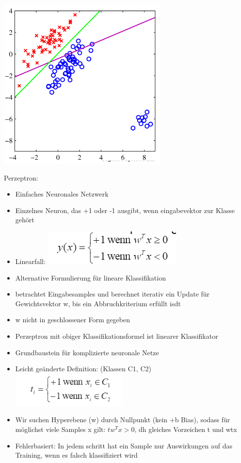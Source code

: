 \documentclass[a4paper,10pt,oneside]{article}
\begin{document}
\begin{itemize}
\includegraphics[scale=0.65]{Grafiken/falschetrennlinie.png}
	
\end{itemize}

Perzeptron:
\begin{itemize}
	\item Einfaches Neuronales Netzwerk
	\item Einzelnes Neuron, das +1 oder -1 ausgibt, wenn eingabevektor zur Klasse gehört
	\item Linearfall:
	\includegraphics[scale=0.65]{Grafiken/perzeptron1.png}
	\item Alternative Formulierung für lineare Klassifikation
	\item betrachtet Eingabesamples und berechnet iterativ ein Update für Gewichtsvektor w, bis ein Abbruchkriterium erfüllt isdt
	\item w nicht in geschlossener Form gegeben
	\item Perzeptron mit obiger Klassifikationsformel ist linearer Klassifikator
	\item Grundbaustein für komplizierte neuronale Netze
	\item Leicht geänderte Definition: (Klassen C1, C2)
		\includegraphics[scale=0.65]{Grafiken/perzeptron2.png}
	\item Wir suchen Hyperebene (w) durch Nullpunkt (kein +b Bias), sodass für möglichst viele Samples x gilt: $tw^Tx>0$, dh gleiches Vorzeichen t und wtx
	\item Fehlerbasiert: In jedem schritt hat ein Sample nur Auswirkungen auf das Training, wenn es falsch klassifiziert wird
\end{itemize}
\end{document}
